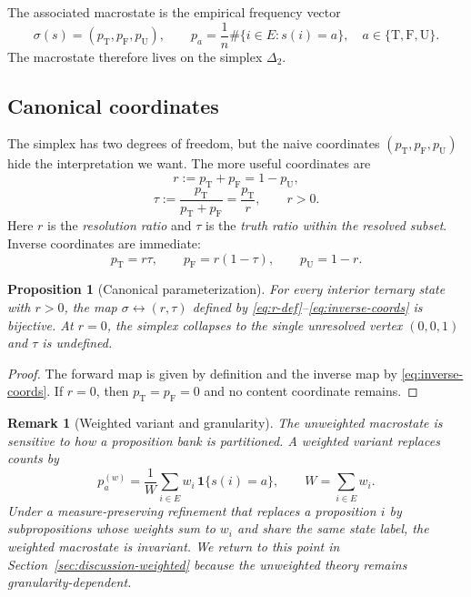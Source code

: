 \documentclass[11pt]{article}
\newtheorem{proposition}[definition]{Proposition}
\newtheorem{remark}[definition]{Remark}
\newcommand{\T}{\mathrm{T}}
\newcommand{\F}{\mathrm{F}}
\newcommand{\U}{\mathrm{U}}
\newcommand{\1}{\mathbf{1}}
\begin{document}
The associated macrostate is the empirical frequency vector
\[
 \sigma(s)=(p_\T,p_\F,p_\U),
 \qquad
 p_a=\frac{1}{n}\#\{i\in E:s(i)=a\},\quad a\in\{\T,\F,\U\}.
\]
The macrostate therefore lives on the simplex $\Delta_2$.

\subsection{Canonical coordinates}

The simplex has two degrees of freedom, but the naive coordinates $(p_\T,p_\F,p_\U)$ hide the interpretation we want. The more useful coordinates are
\begin{equation}
 r:=p_\T+p_\F=1-p_\U,
 \label{eq:r-def}
\end{equation}
\begin{equation}
 \tau:=\frac{p_\T}{p_\T+p_\F}=\frac{p_\T}{r},\qquad r>0.
 \label{eq:tau-def}
\end{equation}
Here $r$ is the \emph{resolution ratio} and $\tau$ is the \emph{truth ratio within the resolved subset}. Inverse coordinates are immediate:
\begin{equation}
 p_\T=r\tau,
 \qquad
 p_\F=r(1-\tau),
 \qquad
 p_\U=1-r.
 \label{eq:inverse-coords}
\end{equation}

\begin{proposition}[Canonical parameterization]
For every interior ternary state with $r>0$, the map $\sigma\leftrightarrow(r,\tau)$ defined by \eqref{eq:r-def}--\eqref{eq:inverse-coords} is bijective. At $r=0$, the simplex collapses to the single unresolved vertex $(0,0,1)$ and $\tau$ is undefined.
\end{proposition}

\begin{proof}
The forward map is given by definition and the inverse map by \eqref{eq:inverse-coords}. If $r=0$, then $p_\T=p_\F=0$ and no content coordinate remains.
\end{proof}

\begin{remark}[Weighted variant and granularity]
The unweighted macrostate is sensitive to how a proposition bank is partitioned. A weighted variant replaces counts by
\[
 p_a^{(w)}=\frac{1}{W}\sum_{i\in E} w_i\,\1\{s(i)=a\},
 \qquad
 W=\sum_{i\in E} w_i.
\]
Under a measure-preserving refinement that replaces a proposition $i$ by subpropositions whose weights sum to $w_i$ and share the same state label, the weighted macrostate is invariant. We return to this point in Section~\ref{sec:discussion-weighted} because the unweighted theory remains granularity-dependent.
\end{remark}
\end{document}
